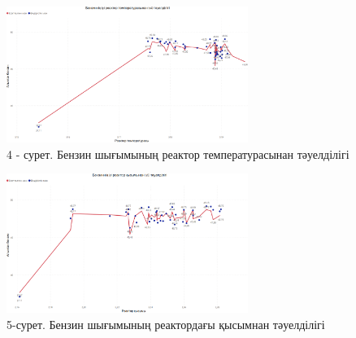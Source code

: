 \begin{figure}[H]
	\centering
	\includegraphics[width=0.7\textwidth]{media/ict/image97}
	\caption*{4 - сурет. Бензин шығымының реактор температурасынан
тәуелділігі}
\end{figure}

\begin{figure}[H]
	\centering
	\includegraphics[width=0.7\textwidth]{media/ict/image98}
	\caption*{5-сурет. Бензин шығымының реактордағы қысымнан тәуелділігі}
\end{figure}

